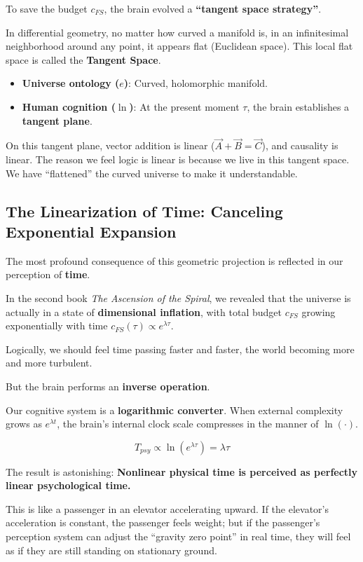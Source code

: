 To save the budget $c_{FS}$, the brain evolved a \textbf{``tangent space strategy''}.

In differential geometry, no matter how curved a manifold is, in an infinitesimal neighborhood around any point, it appears flat (Euclidean space). This local flat space is called the \textbf{Tangent Space}.

\begin{itemize}
\item \textbf{Universe ontology ($e$)}: Curved, holomorphic manifold.

\item \textbf{Human cognition ($\ln$)}: At the present moment $\tau$, the brain establishes a \textbf{tangent plane}.
\end{itemize}

On this tangent plane, vector addition is linear ($\vec{A} + \vec{B} = \vec{C}$), and causality is linear. The reason we feel logic is linear is because we live in this tangent space. We have ``flattened'' the curved universe to make it understandable.

\subsection{The Linearization of Time: Canceling Exponential Expansion}

The most profound consequence of this geometric projection is reflected in our perception of \textbf{time}.

In the second book \textit{The Ascension of the Spiral}, we revealed that the universe is actually in a state of \textbf{dimensional inflation}, with total budget $c_{FS}$ growing exponentially with time $c_{FS}(\tau) \propto e^{\lambda \tau}$.

Logically, we should feel time passing faster and faster, the world becoming more and more turbulent.

But the brain performs an \textbf{inverse operation}.

Our cognitive system is a \textbf{logarithmic converter}. When external complexity grows as $e^{\lambda t}$, the brain's internal clock scale compresses in the manner of $\ln(\cdot)$.

$$T_{psy} \propto \ln(e^{\lambda \tau}) = \lambda \tau$$

The result is astonishing: \textbf{Nonlinear physical time is perceived as perfectly linear psychological time.}

This is like a passenger in an elevator accelerating upward. If the elevator's acceleration is constant, the passenger feels weight; but if the passenger's perception system can adjust the ``gravity zero point'' in real time, they will feel as if they are still standing on stationary ground.

